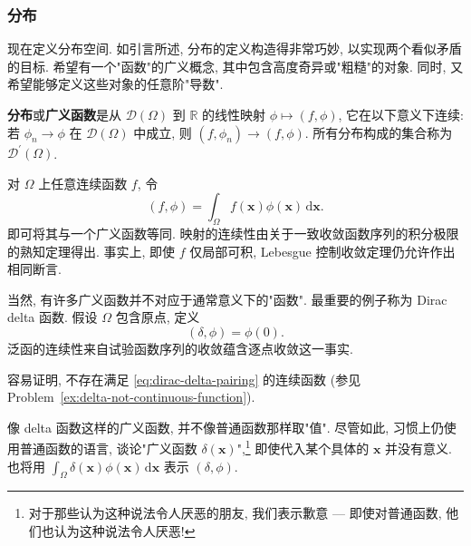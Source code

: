 \subsubsection{分布}\label{subsec:distributions-definition}

现在定义分布空间. 如引言所述, 分布的定义构造得非常巧妙, 以实现两个看似矛盾的目标. 希望有一个"函数"的广义概念, 其中包含高度奇异或"粗糙"的对象. 同时, 又希望能够定义这些对象的任意阶"导数".

\begin{Definition}
\label{def:distribution}
\textbf{分布}或\textbf{广义函数}是从 $\mathcal{D}(\Omega)$ 到 $\mathbb{R}$ 的线性映射 $\phi\mapsto(f,\phi)$, 它在以下意义下连续: 若 $\phi_n\to\phi$ 在 $\mathcal{D}(\Omega)$ 中成立, 则 $(f,\phi_n)\to(f,\phi)$. 所有分布构成的集合称为 $\mathcal{D}^{\prime}(\Omega)$.
\end{Definition}

\begin{Example}
\label{ex:regular-distribution}
对 $\Omega$ 上任意连续函数 $f$, 令
\begin{equation}\label{eq:regular-distribution-pairing}
(f,\phi)=\int_\Omega f(\bm{x})\phi(\bm{x})\,\mathrm{d}\bm{x}.
\end{equation}
即可将其与一个广义函数等同. 映射的连续性由关于一致收敛函数序列的积分极限的熟知定理得出. 事实上, 即使 $f$ 仅局部可积, Lebesgue 控制收敛定理仍允许作出相同断言.
\end{Example}

\begin{Example}
\label{ex:dirac-delta}
当然, 有许多广义函数并不对应于通常意义下的"函数". 最重要的例子称为 Dirac delta 函数. 假设 $\Omega$ 包含原点, 定义
\begin{equation}\label{eq:dirac-delta-pairing}
(\delta,\phi)=\phi(0).
\end{equation}
泛函的连续性来自试验函数序列的收敛蕴含逐点收敛这一事实.

容易证明, 不存在满足 \eqref{eq:dirac-delta-pairing} 的连续函数 (参见 Problem~\ref{ex:delta-not-continuous-function}).
\end{Example}

\begin{Remark}
\label{rem:generalized-function-point-values}
像 delta 函数这样的广义函数, 并不像普通函数那样取"值". 尽管如此, 习惯上仍使用普通函数的语言, 谈论"广义函数 $\delta(\bm{x})$",\footnote{对于那些认为这种说法令人厌恶的朋友, 我们表示歉意 --- 即使对普通函数, 他们也认为这种说法令人厌恶!} 即使代入某个具体的 $\bm{x}$ 并没有意义. 也将用 $\int_\Omega\delta(\bm{x})\phi(\bm{x})\,\mathrm{d}\bm{x}$ 表示 $(\delta,\phi)$.
\end{Remark}


